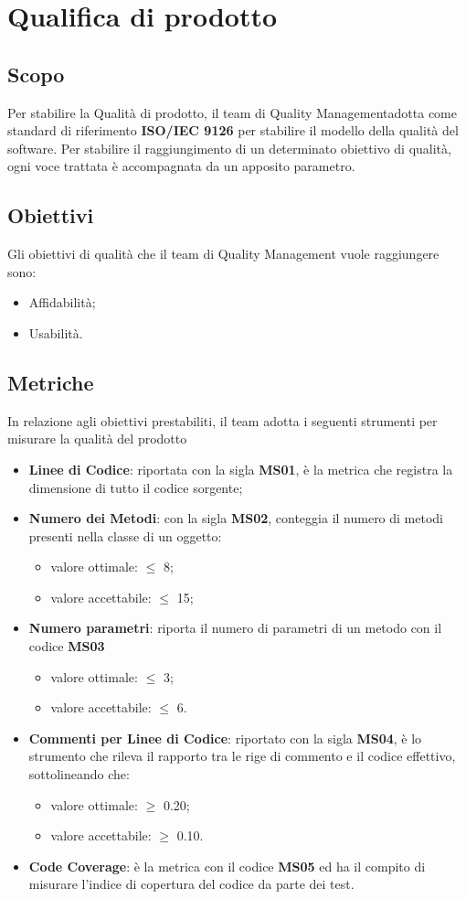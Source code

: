 \section{Qualifica di prodotto}
\subsection{Scopo}
Per stabilire la Qualità di prodotto, il team di Quality Management\glo adotta come standard di riferimento \textbf{ISO/IEC 9126} per stabilire il modello della qualità del software. Per stabilire il raggiungimento di un determinato obiettivo di qualità, ogni voce trattata è accompagnata da un apposito parametro.
\subsection{Obiettivi}
Gli obiettivi di qualità che il team di Quality Management vuole raggiungere sono:
\begin{itemize}
\item Affidabilità;
\item Usabilità.
\end{itemize}
\subsection{Metriche}
In relazione agli obiettivi prestabiliti, il team adotta i seguenti strumenti per misurare la qualità del prodotto 
\begin{itemize}
\item \textbf{Linee di Codice}: riportata con la sigla \textbf{MS01}, è la metrica che registra la dimensione di tutto il codice sorgente;
\item \textbf{Numero dei Metodi}: con la sigla \textbf{MS02}, conteggia il numero di metodi presenti nella classe di un oggetto:
	\begin{itemize}
	\item valore ottimale: $\leq$ 8;
	\item valore accettabile: $\leq$ 15;
	\end{itemize}
\item \textbf{Numero parametri}: riporta il numero di parametri di un metodo con il codice \textbf{MS03}
	\begin{itemize}
	\item valore ottimale: $\leq$ 3;
	\item valore accettabile: $\leq$ 6.
	\end{itemize}
\item \textbf{Commenti per Linee di Codice}: riportato con la sigla \textbf{MS04}, è lo strumento che rileva il rapporto tra le rige di commento e il codice effettivo, sottolineando che:
	\begin{itemize}
		\item valore ottimale: $\geq$ 0.20;
		\item valore accettabile: $\geq$ 0.10.
	\end{itemize}
\item \textbf{Code Coverage}: è la metrica con il codice \textbf{MS05} ed ha il compito di misurare l'indice di copertura del codice da parte dei test.

\end{itemize}

